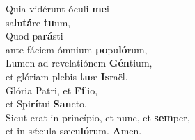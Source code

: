 \evenverse Quia vidérunt óculi \textbf{me}i~\*\\
\evenverse salu\textbf{tá}re \textbf{tu}um,\\
\oddverse Quod pa\textbf{rá}sti~\*\\
\oddverse ante fáciem ómnium \textbf{po}pu\textbf{ló}rum,\\
\evenverse Lumen ad revelatiónem \textbf{Gén}tium,~\*\\
\evenverse et glóriam plebis \textbf{tu}æ \textbf{Is}raël.\\
\oddverse Glória Patri, et \textbf{Fí}lio,~\*\\
\oddverse et Spi\textbf{rí}tui \textbf{San}cto.\\
\evenverse Sicut erat in princípio, et nunc, et \textbf{sem}per,~\*\\
\evenverse et in sǽcula sæcu\textbf{ló}rum. \textbf{A}men.\\
